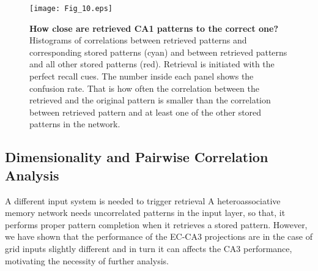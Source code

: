 \documentclass[utf8]{frontiersSCNS} %
\begin{document}
\begin{figure}[!htb]
\centering\texttt{[image: Fig\_10.eps]}
\caption{\textbf{How close are retrieved CA1 patterns to the correct one?} Histograms of correlations between retrieved patterns and corresponding stored patterns (cyan) and between retrieved patterns and all other stored patterns (red). Retrieval is initiated with the perfect recall cues. The number inside each panel shows the confusion rate. That is how often the correlation between the retrieved and the original pattern is smaller than the correlation between retrieved pattern and at least one of the other stored patterns in the network.} 
\label{Fig_10}
\end{figure}


\subsection{Dimensionality and Pairwise Correlation Analysis}

A different input system is needed to trigger retrieval
A heteroassociative memory network needs uncorrelated patterns in the input layer, so that, it performs proper pattern completion when it retrieves a stored pattern.
However, we have shown that the performance of the EC-CA3 projections are in the case of grid inputs slightly different and in turn it can affects the CA3 performance, motivating the necessity of further analysis. 



\end{document}

